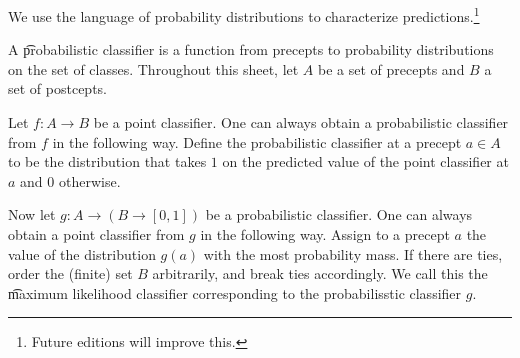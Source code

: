 

We use the language of probability distributions to characterize predictions.\footnote{Future editions will improve this.}


A \t{probabilistic classifier} is a function from precepts to probability distributions on the set of classes.
Throughout this sheet, let $A$ be a set of precepts and $B$ a set of postcepts.


Let $f: A \to B$ be a point classifier.
One can always obtain a probabilistic classifier from $f$ in the following way.
Define the probabilistic classifier at a precept $a \in A$ to be the distribution that takes $1$ on the predicted value of the point classifier at $a$ and $0$ otherwise.

Now let $g: A \to (B \to [0, 1])$ be a probabilistic classifier.
One can always obtain a point classifier from $g$ in the following way.
Assign to a precept $a$ the value of the distribution $g(a)$ with the most probability mass.
If there are ties, order the (finite) set $B$ arbitrarily, and break ties accordingly.
We call this the \t{maximum likelihood classifier} corresponding to the probabilisstic classifier $g$.

\blankpage
